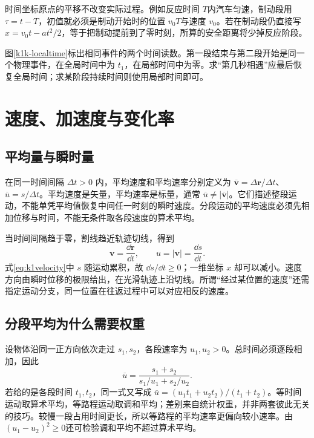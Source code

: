 时间坐标原点的平移不改变实际过程。例如反应时间 $T$内汽车匀速，制动段用 $\tau=t-T$，初值就必须是制动开始时的位置 $v_0T$与速度 $v_0$。若在制动段仍直接写 $x=v_0t-at^2/2$，等于把制动提前到了零时刻，所算的安全距离将少掉反应阶段。

图\ref{k1k-localtime}标出相同事件的两个时间读数。第一段结束与第二段开始是同一个物理事件，在全局时间中为 $t_1$，在局部时间中为零。求“第几秒相遇”应最后恢复全局时间；求某阶段持续时间则使用局部时间即可。



\section{速度、加速度与变化率}
\subsection{平均量与瞬时量}
在同一时间间隔 $\Delta t>0$ 内，平均速度和平均速率分别定义为 $\overline{\bm v}=\Delta\bm r/\Delta t$、$\overline u=s/\Delta t$。平均速度是矢量，平均速率是标量，通常 $\overline u\ne|\overline{\bm v}|$。它们描述整段运动，不能单凭平均值恢复中间任一时刻的瞬时速度。分段运动的平均速度必须先相加位移与时间，不能无条件取各段速度的算术平均。

当时间间隔趋于零，割线趋近轨迹切线，得到
\begin{equation}\bm v=\frac{\dd\bm r}{\dd t},\qquad u=|\bm v|=\frac{\dd s}{\dd t}.\label{eq:k1velocity}\end{equation}
式\eqref{eq:k1velocity}中 $s$ 随运动累积，故 $\dd s/\dd t\ge0$；一维坐标 $x$ 却可以减小。速度方向由瞬时位移的极限给出，在光滑轨迹上沿切线。所谓“经过某位置的速度”还需指定运动分支，同一位置在往返过程中可以对应相反的速度。

\subsection{分段平均为什么需要权重}
设物体沿同一正方向依次走过 $s_1,s_2$，各段速率为 $u_1,u_2>0$。总时间必须逐段相加，因此
\[\overline u=\frac{s_1+s_2}{s_1/u_1+s_2/u_2}.
\]
若给的是各段时间 $t_1,t_2$，同一式又写成 $\overline u=(u_1t_1+u_2t_2)/(t_1+t_2)$。等时间运动取算术平均，等路程运动取调和平均；差别来自统计权重，并非两套彼此无关的技巧。较慢一段占用时间更长，所以等路程的平均速率更偏向较小速率。由 $(u_1-u_2)^2\ge0$还可检验调和平均不超过算术平均。

